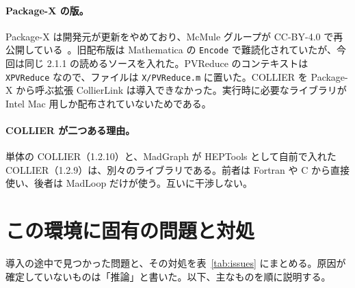 \documentclass[a4paper,10pt]{ltjsarticle}
\newcommand{\bq}{\textasciigrave}
\begin{document}
\paragraph{Package-X の版。}Package-X は開発元が更新をやめており、McMule グループが CC-BY-4.0 で再公開している~\cite{url:px}。旧配布版は Mathematica の \texttt{Encode} で難読化されていたが、今回は同じ 2.1.1 の読めるソースを入れた。PVReduce のコンテキストは \texttt{X\bq PVReduce\bq} なので、ファイルは \texttt{X/PVReduce.m} に置いた。COLLIER を Package-X から呼ぶ拡張 CollierLink は導入できなかった。実行時に必要なライブラリが Intel Mac 用しか配布されていないためである。

\paragraph{COLLIER が二つある理由。}単体の COLLIER（1.2.10）と、MadGraph が HEPTools として自前で入れた COLLIER（1.2.9）は、別々のライブラリである。前者は Fortran や C から直接使い、後者は MadLoop だけが使う。互いに干渉しない。

\section{この環境に固有の問題と対処}\label{sec:issues}

導入の途中で見つかった問題と、その対処を表~\ref{tab:issues} にまとめる。原因が確定していないものは「推論」と書いた。以下、主なものを順に説明する。
\end{document}
